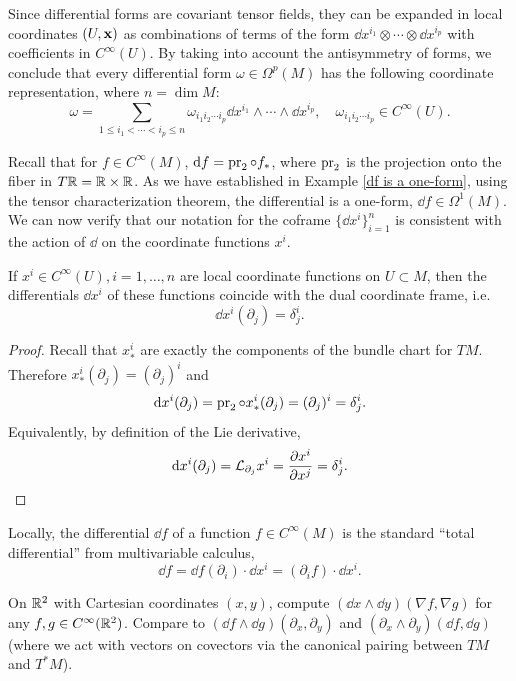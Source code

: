 \begin{rem}
    Since differential forms are covariant tensor fields, they can be expanded in local coordinates $(U,\bf{x})$ as combinations of terms of the form $\dd x^{i_1}\otimes\cdots\otimes \dd x^{i_p}$ with coefficients in $C^\infty(U)$. By taking into account the antisymmetry of forms, we conclude that every differential form $\omega\in\Omega^p(M)$ has the following coordinate representation, where $n=\dim M$:
    \[\omega=\sum_{1\leq i_1<\cdots <i_p\leq n}\omega_{i_1 i_2\cdots i_p}\dd x^{i_1}\wedge\cdots\wedge \dd x^{i_p},\quad \omega_{i_1 i_2\cdots i_p}\in C^\infty(U).\label{eq local rep of a p-form}\]
\end{rem}


Recall that for $f\in C^\infty(M)$, $\dd f=\pr_2\circ f_\ast$, where $\pr_2$ is the projection onto the fiber in $T\bbR =\bbR \times\bbR $. As we have established in Example \ref{df is a one-form}, using the tensor characterization theorem, the differential is a one-form, $\dd f\in\Omega^1(M)$. We can now verify that our notation for the coframe $\{\dd x^i\}_{i=1}^n$ is consistent with the action of $\dd$ on the coordinate functions $x^i$.

\begin{prop}
    If $x^i\in C^\infty(U),i=1,\ldots,n$ are local coordinate functions on $U\subset M$, then the differentials $\dd x^i$ of these functions coincide with the dual coordinate frame, i.e.
\[\dd x^i(\partial_j)=\delta^i_j.\]
\end{prop}
\begin{proof}
    Recall that $x^i_\ast$ are exactly the components of the bundle chart for $TM$. Therefore $x^i_\ast(\partial_j)=(\partial_j)^i$ and
    \[\dd x^i(\partial_{j})=\pr_2\circ x^i_\ast (\partial_{j})=(\partial_j)^i=\delta^i_j.\]
    Equivalently, by definition of the Lie derivative, 
    \[\dd x^i(\partial_j)=\Lie_{\partial_j}x^i=\frac{\partial x^i}{\partial x^j}=\delta^i_j.\]
\end{proof}
\begin{cor}
    Locally, the differential $\dd f$ of a function $f\in C^\infty(M)$ is the standard ``total differential'' from multivariable calculus, \[\dd f=\dd f(\partial_i)\cdot\dd x^i=(\partial_i f)\cdot \dd x^i.\]
\end{cor}

\begin{xca}
    On $\bbR^2$ with Cartesian coordinates $(x,y)$, compute $(\dd x\wedge \dd y)(\nabla f,\nabla g)$ for any $f,g\in C^\infty(\bbR^2)$. Compare to $(\dd f\wedge \dd g)(\partial_x,\partial_y)$ and $(\partial_x\wedge\partial_y)(\dd f,\dd g)$ (where we act with vectors on covectors via the canonical pairing between $TM$ and $T^\ast M$).
\end{xca}

